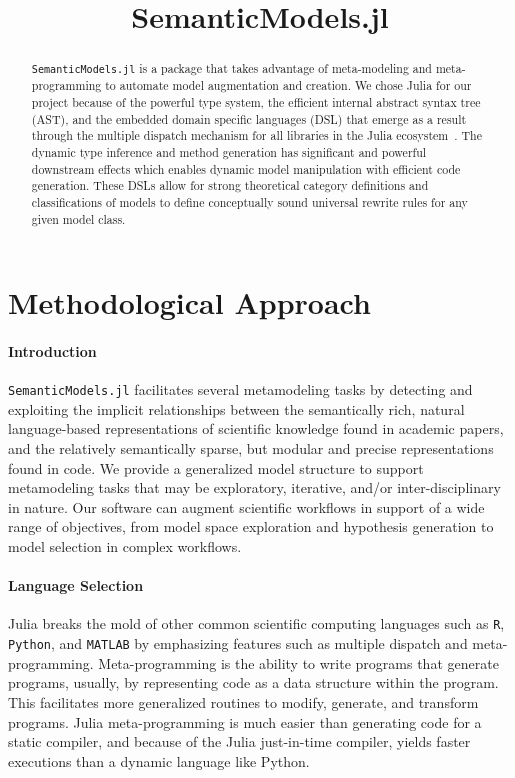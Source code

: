 \documentclass{juliacon}
\title{SemanticModels.jl}
\newcommand{\semanticModels}{\nohyphens{\texttt{SemanticModels.jl}}}
\begin{document}


\maketitle

\begin{abstract}
\semanticModels{} is a package that takes advantage of meta-modeling and meta-programming to automate model augmentation and creation.
We chose Julia for our project because of the powerful type system, the efficient internal abstract syntax tree (AST), and the embedded domain specific languages (DSL) that emerge as a result through the multiple dispatch mechanism for all libraries in the Julia ecosystem~\cite{doi:11.1137/141000671}.
The dynamic type inference and method generation has significant and powerful downstream effects which enables dynamic model manipulation with efficient code generation.
These DSLs allow for strong theoretical category definitions and classifications of models to define conceptually sound universal rewrite rules for any given model class.
\end{abstract}

\section{Methodological Approach}\label{sec:body}
\paragraph{Introduction}\label{par:intro}
\semanticModels{} facilitates several metamodeling tasks by detecting and exploiting the implicit relationships between the semantically rich, natural language-based representations of scientific knowledge found in academic papers, and the relatively semantically sparse, but modular and precise representations found in code.
We provide a generalized model structure to support metamodeling tasks that may be exploratory, iterative, and/or inter-disciplinary in nature.
Our software can augment scientific workflows in support of a wide range of objectives, from model space exploration and hypothesis generation to model selection in complex workflows.

\paragraph{Language Selection}\label{par:julia}
Julia breaks the mold of other common scientific computing languages such as \texttt{R}, \texttt{Python}, and \texttt{MATLAB} by emphasizing features such as multiple dispatch and meta-programming.
Meta-programming is the ability to write programs that generate programs, usually, by representing code as a data structure within the program.
This facilitates more generalized routines to modify, generate, and transform programs.
Julia meta-programming is much easier than generating code for a static compiler, and because of the Julia just-in-time compiler, yields faster executions than a dynamic language like Python.
\end{document}
